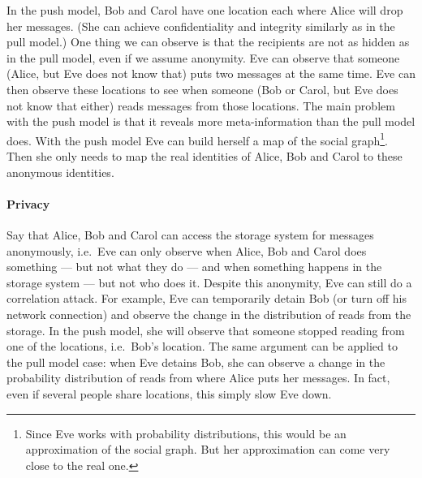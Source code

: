 In the push model, Bob and Carol have one location each where Alice will drop 
her messages.
(She can achieve confidentiality and integrity similarly as in the pull model.)
One thing we can observe is that the recipients are not as hidden as in the 
pull model, even if we assume anonymity.
Eve can observe that someone (Alice, but Eve does not know that) puts two 
messages at the same time.
Eve can then observe these locations to see when someone (Bob or Carol, but Eve
does not know that either) reads messages from those locations.
The main problem with the push model is that it reveals more meta-information 
than the pull model does.
With the push model Eve can build herself a map of the social graph\footnote{%
  Since Eve works with probability distributions, this would be an 
  approximation of the social graph.
  But her approximation can come very close to the real one.
}.
Then she only needs to map the real identities of Alice, Bob and Carol to these 
anonymous identities.

\paragraph{Privacy}

%
Say that Alice, Bob and Carol can access the storage system for messages 
anonymously, i.e.\ Eve can only observe when Alice, Bob and Carol does 
something --- but not what they do --- and when something happens in the 
storage system --- but not who does it.
Despite this anonymity, Eve can still do a correlation attack.
For example, Eve can temporarily detain Bob (or turn off his network 
connection) and observe the change in the distribution of reads from the 
storage.
In the push model, she will observe that someone stopped reading from one of 
the locations, i.e.\ Bob's location.
The same argument can be applied to the pull model case: when Eve detains Bob, 
she can observe a change in the probability distribution of reads from where 
Alice puts her messages.
In fact, even if several people share locations, this simply slow Eve down.

